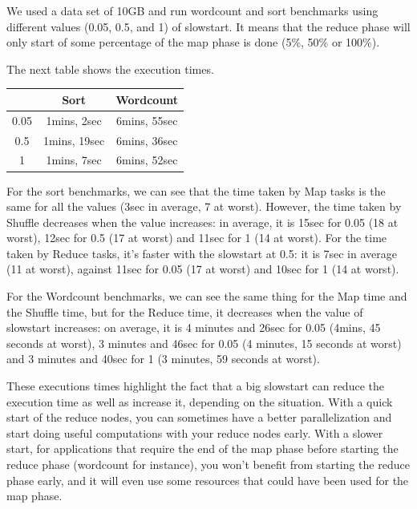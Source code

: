 \documentclass{article}
\begin{document}
We used a data set of 10GB and run wordcount and sort benchmarks using
different values (0.05, 0.5, and 1) of slowstart.
It means that the reduce phase will only start of some percentage of the map phase is done (5\%, 50\% or 100\%).

The next table shows the execution times.

\begin{center}
\begin{tabular}{|c|c|c|}
\hline
\ & Sort & Wordcount \\
\hline
0.05 & 1mins, 2sec & 6mins, 55sec \\
\hline
0.5 & 1mins, 19sec & 6mins, 36sec \\
\hline
1 & 1mins, 7sec & 6mins, 52sec \\
\hline
\end{tabular}
\end{center}

For the sort benchmarks, we can see that the time taken by Map tasks is the same for all the values (3sec in average, 7 at worst).
However, the time taken by Shuffle decreases when the value increases: in average, it is 15sec for 0.05 (18 at worst), 12sec for 0.5 (17 at worst) and 11sec for 1 (14 at worst). For the time taken by Reduce tasks, it's faster with the slowstart at 0.5: it is 7sec in average (11 at worst), against 11sec for 0.05 (17 at worst) and 10sec for 1 (14 at worst).

For the Wordcount benchmarks, we can see the same thing for the Map time and the Shuffle time, but for the Reduce time, it decreases when the value of slowstart increases: on average, it is 4 minutes and 26sec for 0.05 (4mins, 45 seconds at worst), 3 minutes and 46sec for 0.05 (4 minutes, 15 seconds at worst) and 3 minutes and 40sec for 1 (3 minutes, 59 seconds at worst).


These executions times highlight the fact that a big slowstart can reduce the execution time as well as increase it, depending on the situation.
With a quick start of the reduce nodes, you can sometimes have a better parallelization and start doing useful computations with your reduce nodes early.
With a slower start, for applications that require the end of the map phase before starting the reduce phase (wordcount for instance), you won't benefit from starting the reduce phase early, and it will even use some resources that could have been used for the map phase.
\end{document}
